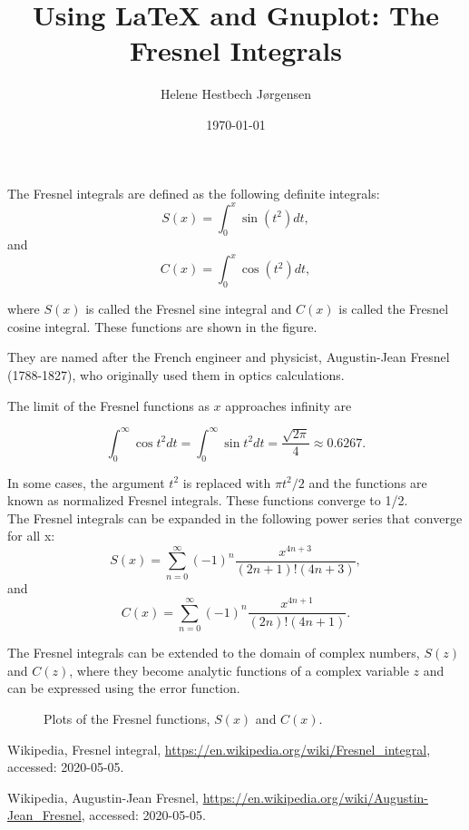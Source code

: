 \documentclass[a4paper,twocolumn,11pt]{article}
\title{Using \LaTeX{} and Gnuplot: The Fresnel Integrals}
\author{Helene Hestbech Jørgensen}
\date{\today}
\begin{document}
\maketitle

\noindent
The Fresnel integrals are defined as the following definite integrals:
\begin{equation}\label{fres-sine}
	S(x)=\int_{0}^{x} \sin\left(t^2\right) dt,
\end{equation}
and
\begin{equation}\label{fres-cos}
	C(x)=\int_{0}^{x} \cos\left(t^2\right) dt,
\end{equation}

\noindent where $S(x)$ is called the Fresnel sine integral and $C(x)$ is called the Fresnel cosine integral. These functions are shown in the figure.

They are named after the French engineer and physicist, Augustin-Jean Fresnel (1788-1827), who originally used them in optics calculations.\

The limit of the Fresnel functions as $x$ approaches infinity are

\begin{equation}
\int_{0}^{\infty} \cos t^2 dt = \int_{0}^{\infty} \sin t^2 dt = \frac{\sqrt{2\pi}}{4} \approx 0.6267.
\end{equation}


In some cases, the argument $t^2$ is replaced with $\pi t^2/2$ and the functions are known as normalized Fresnel integrals. These functions converge to 1/2.\\


The Fresnel integrals can be expanded in the following power series that converge for all x:
\begin{equation}
	S(x)=\sum_{n=0}^{\infty} (-1)^n \frac{x^{4n+3}}{(2n+1)!(4n+3)},
\end{equation}
and 
\begin{equation}
C(x)=\sum_{n=0}^{\infty} (-1)^n \frac{x^{4n+1}}{(2n)!(4n+1)}.
\end{equation}

The Fresnel integrals can be extended to the domain of complex numbers, $S(z)$ and $C(z)$, where they become analytic functions of a complex variable $z$ and can be expressed using the error function.

\begin{figure}[h]\label{fresnel}

\caption{Plots of the Fresnel functions, $S(x)$ and $C(x)$.}
\end{figure}

\begin{thebibliography}{9}
	Wikipedia, Fresnel integral,
	\url{https://en.wikipedia.org/wiki/Fresnel_integral},
	accessed: 2020-05-05.
	
	Wikipedia, Augustin-Jean Fresnel,
	\url{https://en.wikipedia.org/wiki/Augustin-Jean_Fresnel},
	accessed: 2020-05-05.
\end{thebibliography}
\end{document}
